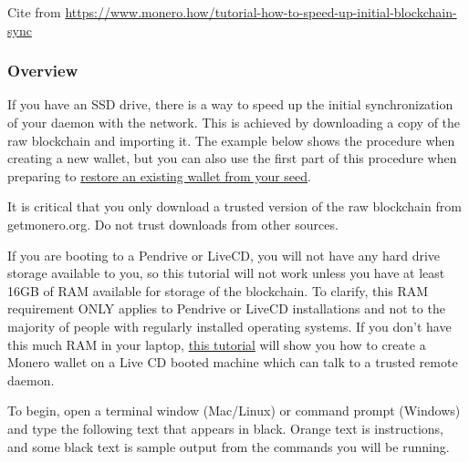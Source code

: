 Cite from \url{https://www.monero.how/tutorial-how-to-speed-up-initial-blockchain-sync}
\subsubsection{Overview}
	If you have an SSD drive, there is a way to speed up the initial synchronization of your daemon with the network. This is achieved by downloading a copy of the raw blockchain and importing it. The example below shows the procedure when creating a new wallet, but you can also use the first part of this procedure when preparing to \href{https://www.monero.how/tutorial-restore-monero-command-line-wallet-from-seed.vm}{restore an existing wallet from your seed}. 
	\begin{importantbox}
		It is critical that you only download a trusted version of the raw blockchain from getmonero.org. Do not trust downloads from other sources. 
	\end{importantbox}
	\begin{warningbox}
		If you are booting to a Pendrive or LiveCD, you will not have any hard drive storage available to you, so this tutorial will not work unless you have at least 16GB of RAM available for storage of the blockchain. To clarify, this RAM requirement ONLY applies to Pendrive or LiveCD installations and not to the majority of people with regularly installed operating systems. If you don't have this much RAM in your laptop, \href{https://www.monero.how/tutorial-how-to-create-a-monero-wallet-linux-boot-usb-pendrive}{this tutorial} will show you how to create a Monero wallet on a Live CD booted machine which can talk to a trusted remote daemon. 
	\end{warningbox}
	To begin, open a terminal window (Mac/Linux) or command prompt (Windows) and type the following text that appears in black. Orange text is instructions, and some black text is sample output from the commands you will be running. 

